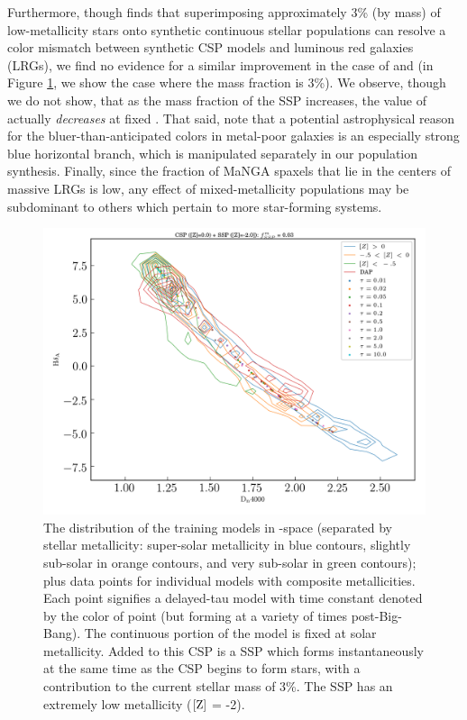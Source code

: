 Furthermore, though \citet{maraston_stromback_09} finds that superimposing approximately 3\% (by mass) of low-metallicity stars onto synthetic continuous stellar populations can resolve a color mismatch between synthetic CSP models and luminous red galaxies (LRGs), we find no evidence for a similar improvement in the case of \Dn and \HdeltaA (in Figure \ref{fig:CSP+lowZ_SSP_mf03}, we show the case where the mass fraction is 3\%). We observe, though we do not show, that as the mass fraction of the SSP increases, the value of \HdeltaA actually \emph{decreases} at fixed \Dn. That said, \citet{maraston_stromback_09} note that a potential astrophysical reason for the bluer-than-anticipated colors in metal-poor galaxies is an especially strong blue horizontal branch, which is manipulated separately in our population synthesis. Finally, since the fraction of MaNGA spaxels that lie in the centers of massive LRGs is low, any effect of mixed-metallicity populations may be subdominant to others which pertain to more star-forming systems.

\begin{figure}
    \centering
    \includegraphics[width=\textwidth]{CSPs+lowZ_SSP_mf03}
    \caption[\Dn-\HdeltaA comparison between training data, MaNGA DAP values, and a set of expanded models]{\fixspacing The distribution of the training models in \Dn-\HdeltaA space (separated by stellar metallicity: super-solar metallicity in blue contours, slightly sub-solar in orange contours, and very sub-solar in green contours); plus data points for individual models with composite metallicities. Each point signifies a delayed-tau model with time constant denoted by the color of point (but forming at a variety of times post-Big-Bang). The continuous portion of the model is fixed at solar metallicity. Added to this CSP is a SSP which forms instantaneously at the same time as the CSP begins to form stars, with a contribution to the current stellar mass of 3\%. The SSP has an extremely low metallicity (${\rm [Z]}$ = -2).}
    \label{fig:CSP+lowZ_SSP_mf03}
\end{figure}

